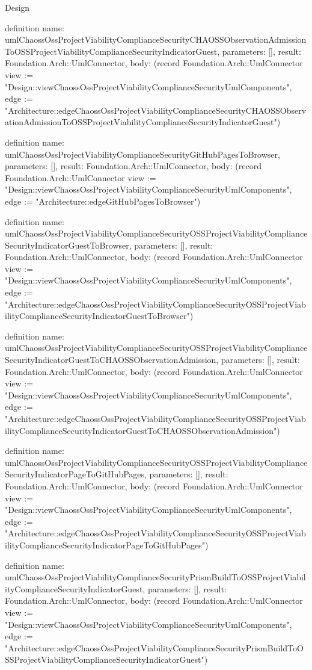 \begin{lexlean}{Design}
\begin{semanticmodule}
definition{
  name: umlChaossOssProjectViabilityComplianceSecurityCHAOSSObservationAdmissionToOSSProjectViabilityComplianceSecurityIndicatorGuest,
  parameters: [],
  result: Foundation.Arch::UmlConnector,
  body: (record Foundation.Arch::UmlConnector {view := "Design::viewChaossOssProjectViabilityComplianceSecurityUmlComponents", edge := "Architecture::edgeChaossOssProjectViabilityComplianceSecurityCHAOSSObservationAdmissionToOSSProjectViabilityComplianceSecurityIndicatorGuest"})
}

definition{
  name: umlChaossOssProjectViabilityComplianceSecurityGitHubPagesToBrowser,
  parameters: [],
  result: Foundation.Arch::UmlConnector,
  body: (record Foundation.Arch::UmlConnector {view := "Design::viewChaossOssProjectViabilityComplianceSecurityUmlComponents", edge := "Architecture::edgeGitHubPagesToBrowser"})
}

definition{
  name: umlChaossOssProjectViabilityComplianceSecurityOSSProjectViabilityComplianceSecurityIndicatorGuestToBrowser,
  parameters: [],
  result: Foundation.Arch::UmlConnector,
  body: (record Foundation.Arch::UmlConnector {view := "Design::viewChaossOssProjectViabilityComplianceSecurityUmlComponents", edge := "Architecture::edgeChaossOssProjectViabilityComplianceSecurityOSSProjectViabilityComplianceSecurityIndicatorGuestToBrowser"})
}

definition{
  name: umlChaossOssProjectViabilityComplianceSecurityOSSProjectViabilityComplianceSecurityIndicatorGuestToCHAOSSObservationAdmission,
  parameters: [],
  result: Foundation.Arch::UmlConnector,
  body: (record Foundation.Arch::UmlConnector {view := "Design::viewChaossOssProjectViabilityComplianceSecurityUmlComponents", edge := "Architecture::edgeChaossOssProjectViabilityComplianceSecurityOSSProjectViabilityComplianceSecurityIndicatorGuestToCHAOSSObservationAdmission"})
}

definition{
  name: umlChaossOssProjectViabilityComplianceSecurityOSSProjectViabilityComplianceSecurityIndicatorPageToGitHubPages,
  parameters: [],
  result: Foundation.Arch::UmlConnector,
  body: (record Foundation.Arch::UmlConnector {view := "Design::viewChaossOssProjectViabilityComplianceSecurityUmlComponents", edge := "Architecture::edgeChaossOssProjectViabilityComplianceSecurityOSSProjectViabilityComplianceSecurityIndicatorPageToGitHubPages"})
}

definition{
  name: umlChaossOssProjectViabilityComplianceSecurityPrismBuildToOSSProjectViabilityComplianceSecurityIndicatorGuest,
  parameters: [],
  result: Foundation.Arch::UmlConnector,
  body: (record Foundation.Arch::UmlConnector {view := "Design::viewChaossOssProjectViabilityComplianceSecurityUmlComponents", edge := "Architecture::edgeChaossOssProjectViabilityComplianceSecurityPrismBuildToOSSProjectViabilityComplianceSecurityIndicatorGuest"})
}


\end{semanticmodule}
\end{lexlean}
